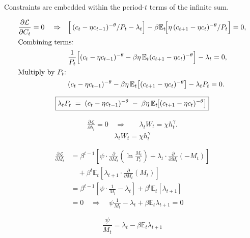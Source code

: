\documentclass[11pt,preprint]{elsarticle}
\numberwithin{equation}{section}
\numberwithin{figure}{section}
\numberwithin{table}{section}
\begin{document}
Constraints are embedded within the period-\(t\) terms of the infinite
sum.

\begin{align*}
  \frac{\partial \mathcal{L}}{\partial C_t} = 0
  \quad\Rightarrow\quad
  &\Bigl[\,(c_t - \eta c_{t-1})^{-\theta}/P_t - \lambda_t\Bigr]
    - \beta \mathbb{E}_t\!\Bigl[\eta\,(c_{t+1}-\eta c_t)^{-\theta}/P_t\Bigr]
    = 0,\\
  \intertext{Combining terms:}
  &\frac{1}{P_t}\Bigl[
     (c_t - \eta c_{t-1})^{-\theta}
     - \beta \eta\,\mathbb{E}_t (c_{t+1} - \eta c_t)^{-\theta}
   \Bigr]
   - \lambda_t
   = 0,\\
  \intertext{Multiply by \(P_t\):}
  &(c_t - \eta c_{t-1})^{-\theta}
   - \beta \eta\,\mathbb{E}_t\bigl[(c_{t+1} - \eta c_t)^{-\theta}\bigr]
   - \lambda_t P_t
   = 0.
\end{align*}

\begin{equation}\label{foc_C}
  \boxed{%
    \lambda_t P_t
    \;=\;
    (c_t - \eta c_{t-1})^{-\theta}
    \;-\;
    \beta \eta\,\mathbb{E}_t\!\bigl[(c_{t+1} - \eta c_t)^{-\theta}\bigr]
  }
\end{equation}

\begin{align*}
  \frac{\partial \mathcal{L}}{\partial h_t} = 0
  \quad\Rightarrow\quad
  &\lambda_t W_t = \chi h_t^{\gamma}.
\end{align*} \begin{equation}\label{foc_h}
  \boxed{\lambda_t W_t = \chi h_t^{\gamma}}
\end{equation}

\begin{align*}
\frac{\partial \mathcal{L}}{\partial M_t} 
&= \beta^{t-1} \left[ 
   \psi \cdot \frac{\partial}{\partial M_t} \left( \ln \frac{M_t}{P_t} \right) 
   + \lambda_t \cdot \frac{\partial}{\partial M_t} (-M_t) 
\right] \\
&\quad + \beta^{t} \mathbb{E}_t \left[ 
   \lambda_{t+1} \cdot \frac{\partial}{\partial M_t} (M_t)
\right] \\
&= \beta^{t-1} \left[ 
   \psi \cdot \frac{1}{M_t} 
   - \lambda_t 
\right] 
+ \beta^{t} \mathbb{E}_t \left[ \lambda_{t+1} \right] \\
&= 0 \quad\Rightarrow\quad
\psi \frac{1}{M_t} - \lambda_t + \beta \mathbb{E}_t \lambda_{t+1} = 0
\end{align*}

\begin{equation}\label{foc_M}
\boxed{\frac{\psi}{M_t} = \lambda_t - \beta \mathbb{E}_t \lambda_{t+1}}
\end{equation}
\end{document}
